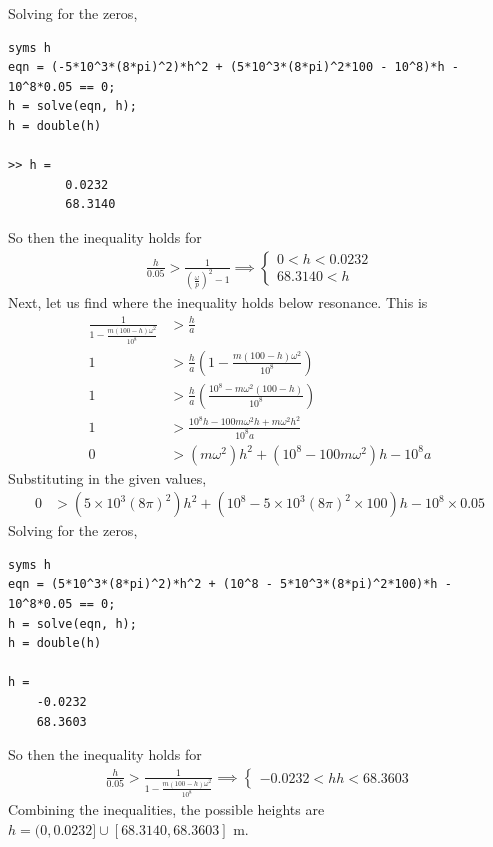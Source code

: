 Solving for the zeros,
\begin{verbatim}
syms h
eqn = (-5*10^3*(8*pi)^2)*h^2 + (5*10^3*(8*pi)^2*100 - 10^8)*h - 10^8*0.05 == 0;
h = solve(eqn, h);
h = double(h)

>> h =
        0.0232
        68.3140
\end{verbatim}
So then the inequality holds for 
\begin{align*}
    \frac{h}{0.05} > \frac{1}{\left(\frac{\omega}{p}\right)^2 - 1} \implies 
    \begin{cases}
        0 < h < 0.0232 \\
        68.3140 < h
    \end{cases}
\end{align*}
Next, let us find where the inequality holds below resonance. This is
\begin{align*}
    \frac{1}{1 - \frac{m(100 - h)\omega^2}{10^8}} &> \frac{h}{a} \\
    1 &> \frac{h}{a} \left(1 - \frac{m(100 - h)\omega^2}{10^8}\right) \\
    1 &> \frac{h}{a} \left(\frac{10^8 - m\omega^2(100 - h)}{10^8}\right) \\
    1 &> \frac{10^8h - 100 m \omega^2h + m\omega^2h^2}{10^8a} \\
    0 &> (m\omega^2)h^2 + (10^8 - 100m\omega^2)h - 10^8a 
\end{align*}
Substituting in the given values,
\begin{align*}
    0 &> (5 \times 10^3(8\pi)^2)h^2 + (10^8 - 5 \times 10^3(8\pi)^2 \times 100)h - 10^8 \times 0.05
\end{align*}
Solving for the zeros,
\begin{verbatim}
syms h
eqn = (5*10^3*(8*pi)^2)*h^2 + (10^8 - 5*10^3*(8*pi)^2*100)*h - 10^8*0.05 == 0;
h = solve(eqn, h);
h = double(h)

h =
    -0.0232
    68.3603
\end{verbatim}
So then the inequality holds for
\begin{align*}
    \frac{h}{0.05} > \frac{1}{1 - \frac{m(100 - h)\omega^2}{10^8}} \implies 
    \begin{cases}
        -0.0232 < h 
        h < 68.3603
    \end{cases}
\end{align*}
Combining the inequalities, the possible heights are $\boxed{h = (0, 0.0232] \cup [68.3140, 68.3603] \text{ m}}$.

